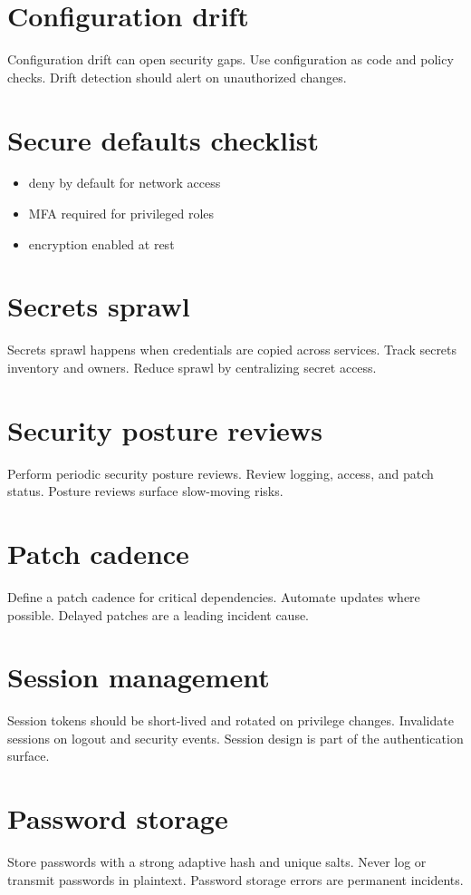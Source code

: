 \section{Configuration drift}
Configuration drift can open security gaps.
Use configuration as code and policy checks.
Drift detection should alert on unauthorized changes.

\section{Secure defaults checklist}
\begin{itemize}[nosep]
  \item deny by default for network access
  \item MFA required for privileged roles
  \item encryption enabled at rest
\end{itemize}

\section{Secrets sprawl}
Secrets sprawl happens when credentials are copied across services.
Track secrets inventory and owners.
Reduce sprawl by centralizing secret access.

\section{Security posture reviews}
Perform periodic security posture reviews.
Review logging, access, and patch status.
Posture reviews surface slow-moving risks.

\section{Patch cadence}
Define a patch cadence for critical dependencies.
Automate updates where possible.
Delayed patches are a leading incident cause.

\section{Session management}
Session tokens should be short-lived and rotated on privilege changes.
Invalidate sessions on logout and security events.
Session design is part of the authentication surface.

\section{Password storage}
Store passwords with a strong adaptive hash and unique salts.
Never log or transmit passwords in plaintext.
Password storage errors are permanent incidents.

